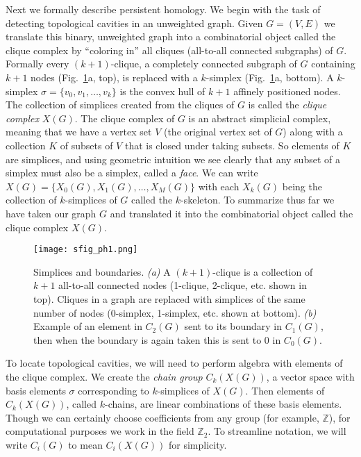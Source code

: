 \documentclass{article}
\begin{document}
Next we formally describe persistent homology. We begin with the task of detecting topological cavities in an unweighted graph. Given $G = (V,E)$ we translate this binary, unweighted graph into a combinatorial object called the clique complex by ``coloring in'' all cliques (all-to-all connected subgraphs) of $G$. Formally every $(k+1)$-clique, a completely connected subgraph of $G$ containing $k+1$ nodes (Fig.~\ref{fig:sfig_ph1}a, top), is replaced with a $k$-simplex (Fig.~\ref{fig:sfig_ph1}a, bottom). A $k$-simplex $\sigma = \{v_0, v_1, \dots, v_k\}$ is the convex hull of $k+1$ affinely positioned nodes. The collection of simplices created from the cliques of $G$ is called the \emph{clique complex} $X(G)$. The clique complex of $G$ is an abstract simplicial complex, meaning that we have a vertex set $V$ (the original vertex set of $G$) along with a collection $K$ of subsets of $V$ that is closed under taking subsets. So elements of $K$ are simplices, and using geometric intuition we see clearly that any subset of a simplex must also be a simplex, called a \emph{face}.  We can write $X(G) = \{X_0(G), X_1(G), \dots, X_M(G)\}$ with each $X_k(G)$ being the collection of $k$-simplices of $G$ called the $k$-skeleton. To summarize thus far we have taken our graph $G$ and translated it into the combinatorial object called the clique complex $X(G)$.

\begin{figure}
	\centering
	\texttt{[image: sfig\_ph1.png]}
	\caption{Simplices and boundaries. \emph{(a)} A $(k+1)$-clique is a collection of $k+1$ all-to-all connected nodes (1-clique, 2-clique, etc. shown in top). Cliques in a graph are replaced with simplices of the same number of nodes (0-simplex, 1-simplex, etc. shown at bottom). \emph{(b)} Example of an element in $C_2(G)$ sent to its boundary in $C_1(G)$, then when the boundary is again taken this is sent to 0 in $C_0(G)$.}
	\label{fig:sfig_ph1}
\end{figure}

To locate topological cavities, we will need to perform algebra with elements of the clique complex. We create the \emph{chain group} $C_k(X(G))$, a vector space with basis elements $\sigma$ corresponding to $k$-simplices of $X(G)$. Then elements of $C_k(X(G))$, called $k$-chains, are linear combinations of these basis elements. Though we can certainly choose coefficients from any group (for example, $\mathbb{Z}$), for computational purposes we work in the field $\mathbb{Z}_2$. To streamline notation, we will write $C_i(G)$ to mean $C_i(X(G))$ for simplicity.\\
\end{document}
